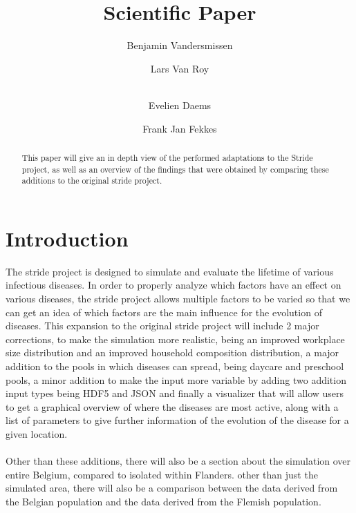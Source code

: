 \documentclass[runningheads]{llncs}
\begin{document}
	\title{Scientific Paper}
	
	\author{Benjamin Vandersmissen \and
		Lars Van Roy \and \\
		Evelien Daems \and
		Frank Jan Fekkes}
	\maketitle              %
	\begin{abstract}
		This paper will give an in depth view of the performed adaptations to the Stride project, as well as an overview of the findings that were obtained by comparing these additions to the original stride project. 
		
		
	\end{abstract}
	
	
	\section{Introduction}
	The stride project is designed to simulate and evaluate the lifetime of various infectious diseases. In order to properly analyze which factors have an effect on various diseases, the stride project allows multiple factors to be varied so that we can get an idea of which factors are the main influence  for the evolution of diseases. This expansion to the original stride project will include 2 major corrections, to make the simulation more realistic, being an improved workplace size distribution and an improved household composition distribution, a major addition to the pools in which diseases can spread, being daycare and preschool pools, a minor addition to make the input more variable by adding two addition input types being HDF5 and JSON and finally a visualizer that will allow users to get a graphical overview of where the diseases are most active, along with a list of parameters to give further information of the evolution of the disease for a given location. \\
	\\
	Other than these additions, there will also be a section about the simulation over entire Belgium, compared to isolated within Flanders. other than just the simulated area, there will also be a comparison between the data derived from the Belgian population and the data derived from the Flemish population.
	
\end{document}
